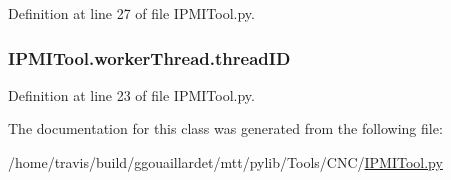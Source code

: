 Definition at line 27 of file I\-P\-M\-I\-Tool.\-py.

\hypertarget{classIPMITool_1_1workerThread_ad9622aa9a06ed124fa430c7f57335335}{
\subsubsection[{thread\-I\-D}]{\setlength{\rightskip}{0pt plus 5cm}I\-P\-M\-I\-Tool.\-worker\-Thread.\-thread\-I\-D}}\label{classIPMITool_1_1workerThread_ad9622aa9a06ed124fa430c7f57335335}


Definition at line 23 of file I\-P\-M\-I\-Tool.\-py.



The documentation for this class was generated from the following file\-:\begin{DoxyCompactItemize}
\item 
/home/travis/build/ggouaillardet/mtt/pylib/\-Tools/\-C\-N\-C/\hyperlink{IPMITool_8py}{I\-P\-M\-I\-Tool.\-py}\end{DoxyCompactItemize}
